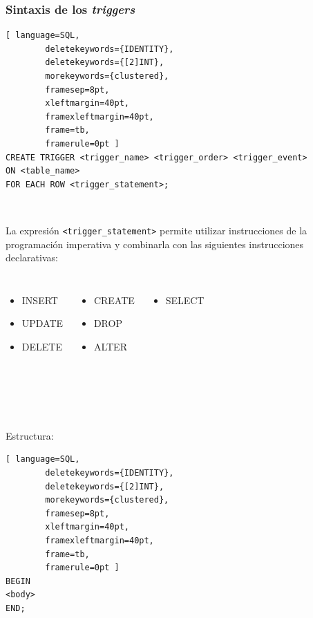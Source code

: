\documentclass[
	10pt, %
	aspectratio=169, %
]{beamer}
\begin{document}
\begin{frame}[fragile]
	
	\frametitle{Sintaxis de los \emph{triggers}}
	
	\begin{lstlisting}[ language=SQL,
		deletekeywords={IDENTITY},
		deletekeywords={[2]INT},
		morekeywords={clustered},
		framesep=8pt,
		xleftmargin=40pt,
		framexleftmargin=40pt,
		frame=tb,
		framerule=0pt ]
CREATE TRIGGER <trigger_name> <trigger_order> <trigger_event> 
ON <table_name> 
FOR EACH ROW <trigger_statement>;
\end{lstlisting}

	\ 
	
	\pause
	
	La expresión \texttt{<trigger\_statement>} permite utilizar instrucciones de la programación imperativa y combinarla con las siguientes instrucciones declarativas: 
	\begin{columns}[t]
		
		\begin{itemize}
			\item \textcolor{codepurple}{INSERT}
			\item \textcolor{codepurple}{UPDATE}
			\item \textcolor{codepurple}{DELETE}
		\end{itemize}
		
		
		\begin{itemize}
			\item \textcolor{codepurple}{CREATE}
			\item \textcolor{codepurple}{DROP}
			\item \textcolor{codepurple}{ALTER}
		\end{itemize}
		
		
		\begin{itemize}
			\item \textcolor{codepurple}{SELECT}
		\end{itemize}
		
	\end{columns}
	
	\ 
	
	\ 
	
	\pause
	
	Estructura: 
		\begin{lstlisting}[ language=SQL,
		deletekeywords={IDENTITY},
		deletekeywords={[2]INT},
		morekeywords={clustered},
		framesep=8pt,
		xleftmargin=40pt,
		framexleftmargin=40pt,
		frame=tb,
		framerule=0pt ]
BEGIN
<body>
END;
\end{lstlisting}
	
\end{frame}
\end{document}

